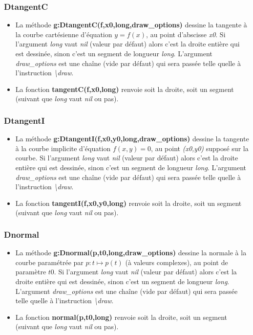 \subsubsection{ DtangentC}
\begin{itemize}
    \item La méthode \textbf{g:DtangentC(f,x0,long,draw\_options)} dessine la tangente à la courbe cartésienne d'équation \(y=f(x)\), au point d'abscisse \emph{x0}. Si l'argument \emph{long} vaut \emph{nil} (valeur par défaut) alors c'est la droite entière qui est dessinée, sinon c'est un segment de longueur \emph{long}. L'argument \emph{draw\_options} est une chaîne (vide par défaut) qui sera passée telle quelle à l'instruction \emph{\textbackslash draw}.
    \item La fonction \textbf{tangentC(f,x0,long)} renvoie soit la droite, soit un segment (suivant que \emph{long} vaut \emph{nil} ou pas).
\end{itemize}

\subsubsection{ DtangentI}
\begin{itemize}
    \item La méthode \textbf{g:DtangentI(f,x0,y0,long,draw\_options)} dessine la tangente à la courbe implicite d'équation \(f(x,y)=0\), au point \emph{(x0,y0)} supposé sur la courbe. Si l'argument \emph{long} vaut \emph{nil} (valeur par défaut) alors c'est la droite entière qui est dessinée, sinon c'est un segment de longueur \emph{long}. L'argument \emph{draw\_options} est une chaîne (vide par défaut) qui sera passée telle quelle à l'instruction \emph{\textbackslash draw}.
    \item La fonction \textbf{tangentI(f,x0,y0,long)} renvoie soit la droite, soit un segment (suivant que \emph{long} vaut \emph{nil} ou pas).
\end{itemize}

\subsubsection{Dnormal}
\begin{itemize}
    \item La méthode \textbf{g:Dnormal(p,t0,long,draw\_options)} dessine la normale à la courbe paramétrée par \(p: t \mapsto p(t)\) (à valeurs complexes), au point de paramètre \(t0\). Si l'argument \emph{long} vaut \emph{nil} (valeur par défaut) alors c'est la droite entière qui est dessinée, sinon c'est un segment de longueur \emph{long}. L'argument \emph{draw\_options} est une chaîne (vide par défaut) qui sera passée telle quelle à l'instruction \emph{\textbackslash draw}.
    \item La fonction \textbf{normal(p,t0,long)} renvoie soit la droite, soit un segment (suivant que \emph{long} vaut \emph{nil} ou pas).
\end{itemize}

